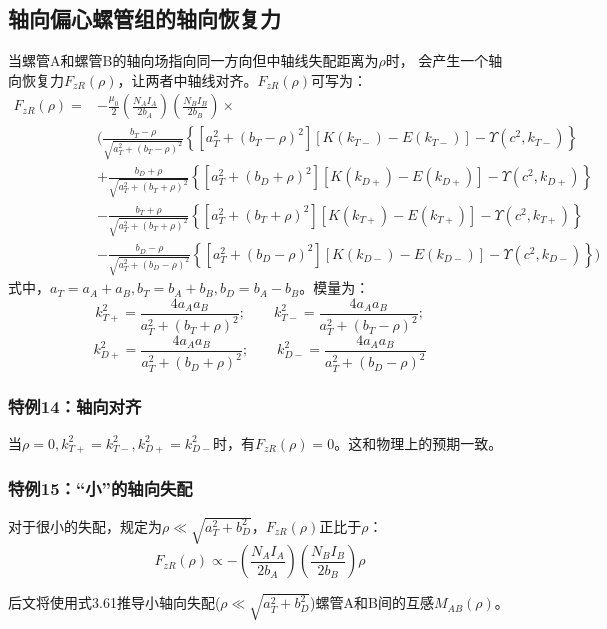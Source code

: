 \subsection{轴向偏心螺管组的轴向恢复力}
当螺管A和螺管B的轴向场指向同一方向但中轴线失配距离为$\rho$时，
会产生一个轴向恢复力$F_{zR}(\rho)$，让两者中轴线对齐。$F_{zR}(\rho)$可写为：
\begin{equation}
\begin{split}
F_{zR}(\rho)=&-\frac{\mu_0}{2}\left(\frac{N_AI_A}{2b_A}\right)\left(\frac{N_BI_B}{2b_B}\right)\times\\
&\bigg(\frac{b_T-\rho}{\sqrt{a_T^2+(b_T-\rho)^2}}\left\{[a_T^2+(b_T-\rho)^2][K(k_{T-})-E(k_{T-})]-\Upsilon(c^2,k_{T-})\right\}\\
&+\frac{b_D+\rho}{\sqrt{a_T^2+(b_T+\rho)^2}}\left\{[a_T^2+(b_D+\rho)^2][K(k_{D+})-E(k_{D+})]-\Upsilon(c^2,k_{D+})\right\}\\
&-\frac{b_T+\rho}{\sqrt{a_T^2+(b_T+\rho)^2}}\left\{[a_T^2+(b_T+\rho)^2][K(k_{T+})-E(k_{T+})]-\Upsilon(c^2,k_{T+})\right\}\\
&-\frac{b_D-\rho}{\sqrt{a_T^2+(b_D-\rho)^2}}\left\{[a_T^2+(b_D-\rho)^2][K(k_{D-})-E(k_{D-})]-\Upsilon(c^2,k_{D-})\right\}\bigg)
\end{split}
\end{equation}
式中，$a_T=a_A+a_B, b_T=b_A+b_B, b_D=b_A−b_B$。模量为：
$$
k_{T+}^2=\frac{4a_Aa_B}{a_T^2+(b_T+\rho)^2};\qquad k_{T-}^2=\frac{4a_Aa_B}{a_T^2+(b_T-\rho)^2};$$
$$k_{D+}^2=\frac{4a_Aa_B}{a_T^2+(b_D+\rho)^2}; \qquad k_{D-}^2=\frac{4a_Aa_B}{a_T^2+(b_D-\rho)^2}$$


\subsubsection{特例14：轴向对齐}
当$\rho=0, k_{T+}^2=k_{T-}^2, k_{D+}^2=k_{D-}^2$时，有$F_{zR}(\rho)=0$。这和物理上的预期一致。

\subsubsection{特例15：``小''的轴向失配}
对于很小的失配，规定为$\rho\ll \sqrt{a_T^2+b_D^2}$，$F_{zR}(\rho)$正比于$\rho$：
\begin{equation}
F_{zR}(\rho)\propto-\left(\frac{N_AI_A}{2b_A}\right)\left(\frac{N_BI_B}{2b_B}\right)\rho
\end{equation}

后文将使用式3.61推导小轴向失配($\rho\ll \sqrt{a_T^2+b_D^2}$)螺管A和B间的互感$M_{AB}(\rho)$。




